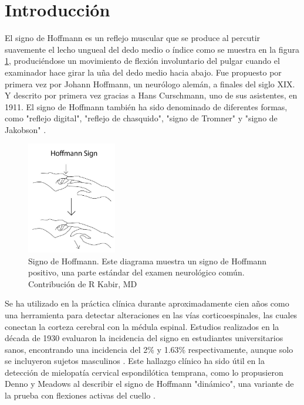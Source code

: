 \section{Introducción}
El signo de Hoffmann es un reflejo muscular que se produce al percutir suavemente el lecho ungueal del dedo medio o índice como se muestra en la figura \ref{fig:Hoffman_sign}, produciéndose un movimiento de flexión involuntario del pulgar cuando el examinador hace girar la uña del dedo medio hacia abajo. Fue propuesto por primera vez por Johann Hoffmann, un neurólogo alemán, a finales del siglo XIX. Y descrito por primera vez gracias a Hans Curschmann, uno de sus asistentes, en 1911\cite{ BENDHEIM}. El signo de Hoffmann también ha sido denominado de diferentes formas, como "reflejo digital", "reflejo de chasquido", "signo de Tromner" y "signo de Jakobson" \cite{glaser2001cervical}.


\begin{figure}[h!]
	\includegraphics[width=0.35\textwidth]{figures/Kabir_Hoffmann__Sign.jpg}
	\caption{Signo de Hoffmann. Este diagrama muestra un signo de Hoffmann positivo, una parte estándar del examen neurológico común. Contribución de R Kabir, MD}
	\label{fig:Hoffman_sign}
\end{figure}

Se ha utilizado en la práctica clínica durante aproximadamente cien años como una herramienta para detectar alteraciones en las vías corticoespinales, las cuales conectan la corteza cerebral con la médula espinal. Estudios realizados en la década de 1930 evaluaron la incidencia del signo en estudiantes universitarios sanos, encontrando una incidencia del 2\% y 1.63\% respectivamente, aunque solo se incluyeron sujetos masculinos \cite{glaser2001cervical}. Este hallazgo clínico ha sido útil en la detección de mielopatía cervical espondilótica temprana, como lo propusieron Denno y Meadows al describir el signo de Hoffmann "dinámico", una variante de la prueba con flexiones activas del cuello \cite{glaser2001cervical}.

